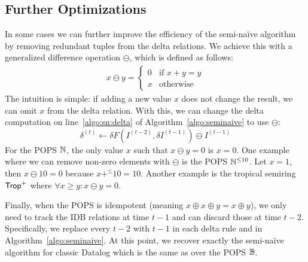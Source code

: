 \subsection{Further Optimizations}
\label{sec:redundant}
In some cases we can further improve the efficiency of the semi-na\"ive algorithm
 by removing redundant tuples from the delta relations.
We achieve this with a generalized difference operation $\ominus$,
 which is defined as follows:
%
\begin{align*}
  x \ominus y = \begin{cases}
    0 & \text{if } x + y = y \\
    x & \text{otherwise}
  \end{cases}
\end{align*}
%
The intuition is simple: if adding a new value $x$ does not change the result, 
 we can omit $x$ from the delta relation.
With this, we can change the delta computation
 on line~\ref{algo:sn:delta}
 of Algorithm~\ref{algo:seminaive} 
 to use $\ominus$:
%
$$\delta^{(t)} \gets \delta F(I^{(t-2)}, \delta I^{(t-1)}) \ominus I^{(t-1)}$$
%
For the POPS $\mathbb N$, the only value $x$ such that $x \ominus y = 0$ is $x = 0$. 
One example where we can remove non-zero elements with $\ominus$ 
 is the POPS ${\mathbb N}^{\leq 10}$.
Let $x = 1$, then $x \ominus 10 = 0$ because $x +^{\leq} 10 = 10$.
Another example is the tropical semiring $\text{\sf Trop}^+$
 where $\forall x \geq y : x \ominus y = 0$.

Finally, when the POPS is idempotent (meaning $x \oplus x \oplus y = x \oplus y$),
 we only need to track the IDB relations at time $t-1$
 and can discard those at time $t-2$.
Specifically, we replace every $t-2$ with $t-1$
 in each delta rule and in Algorithm~\ref{algo:seminaive}.
At this point, we recover exactly the semi-na\"ive algorithm for classic Datalog
 which is the same as \datalogo over the POPS $\mathbb B$.